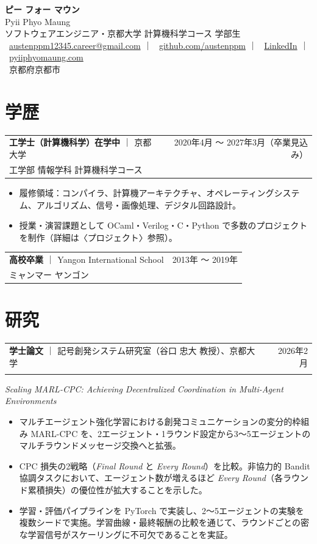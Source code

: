\documentclass[11pt,a4paper]{article}
\makeatletter
\newcommand{\role}[4]{%
  \noindent
  \begin{tabular*}{\linewidth}{@{\extracolsep{\fill}}l r}
    \textbf{#1} \textcolor{muted}{｜} #2 & \textcolor{muted}{#3}\\[-1pt]
    \textcolor{muted}{\small #4} &
  \end{tabular*}\par\vspace{-2pt}
}
\newenvironment{bullets}
  {\begin{itemize}[leftmargin=1.1em, itemsep=1pt, parsep=0pt, topsep=2pt]}
  {\end{itemize}}
\makeatother
\begin{document}
\color{fg}

\begin{center}
  {\Huge\bfseries\sffamily ピー フォー マウン}\\[3pt]
  {\normalsize Pyii Phyo Maung}\\[4pt]
  {\color{muted}\large ソフトウェアエンジニア・京都大学 計算機科学コース 学部生}\\[8pt]
  \small
  \faEnvelope[regular]\ \href{mailto:austenppm12345.career@gmail.com}{austenppm12345.career@gmail.com}
  \quad\textcolor{muted}{｜}\quad
  \faGithub\ \href{https://github.com/austenppm}{github.com/austenppm}
  \quad\textcolor{muted}{｜}\quad
  \faLinkedin\ \href{https://www.linkedin.com/in/pyii-phyo-maung-70435017a/}{LinkedIn}
  \quad\textcolor{muted}{｜}\quad
  \faGlobe\ \href{https://pyiiphyomaung.com}{pyiiphyomaung.com}
  \\[2pt]
  \faMapMarker*\ \textcolor{muted}{京都府京都市}
\end{center}

\vspace{4pt}

\section{学歴}

\role
  {工学士（計算機科学）在学中}
  {京都大学}
  {2020年4月 〜 2027年3月（卒業見込み）}
  {工学部 情報学科 計算機科学コース}
\begin{bullets}
  \item 履修領域：コンパイラ、計算機アーキテクチャ、オペレーティングシステム、アルゴリズム、信号・画像処理、デジタル回路設計。
  \item 授業・演習課題として OCaml・Verilog・C・Python で多数のプロジェクトを制作（詳細は〈プロジェクト〉参照）。
\end{bullets}

\role
  {高校卒業}
  {Yangon International School}
  {2013年 〜 2019年}
  {ミャンマー ヤンゴン}

\section{研究}

\role
  {学士論文}
  {記号創発システム研究室（谷口 忠大 教授）、京都大学}
  {2026年2月}
  {}
\textit{Scaling MARL-CPC: Achieving Decentralized Coordination in Multi-Agent Environments}\par
\begin{bullets}
  \item マルチエージェント強化学習における創発コミュニケーションの変分的枠組み MARL-CPC を、2エージェント・1ラウンド設定から3〜5エージェントのマルチラウンドメッセージ交換へと拡張。
  \item CPC 損失の2戦略（\textit{Final Round} と \textit{Every Round}）を比較。非協力的 Bandit 協調タスクにおいて、エージェント数が増えるほど \textit{Every Round}（各ラウンド累積損失）の優位性が拡大することを示した。
  \item 学習・評価パイプラインを PyTorch で実装し、2〜5エージェントの実験を複数シードで実施。学習曲線・最終報酬の比較を通じて、ラウンドごとの密な学習信号がスケーリングに不可欠であることを実証。
\end{bullets}
\end{document}
